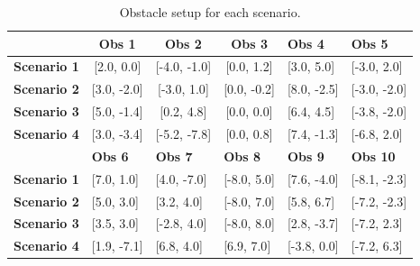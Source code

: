 \documentclass{article}
\begin{document}
\begin{table}[]
	\centering
	\begin{tabular}{|c|l|l|l|l|l|}
		\hline
		& \multicolumn{1}{c|}{\textbf{Obs 1}}  & \multicolumn{1}{c|}{\textbf{Obs 2}}   & \multicolumn{1}{c|}{\textbf{Obs 3}}  & \textbf{Obs 4}  & \textbf{Obs 5}   \\ \hline
		\textbf{Scenario 1}             & \multicolumn{1}{c|}{{[}2.0, 0.0{]}}  & \multicolumn{1}{c|}{{[}-4.0, -1.0{]}} & \multicolumn{1}{c|}{{[}0.0, 1.2{]}}  & {[}3.0, 5.0{]}  & {[}-3.0, 2.0{]}  \\ \hline
		\textbf{Scenario 2}             & \multicolumn{1}{c|}{{[}3.0, -2.0{]}} & \multicolumn{1}{c|}{{[}-3.0, 1.0{]}}  & \multicolumn{1}{c|}{{[}0.0, -0.2{]}} & {[}8.0, -2.5{]} & {[}-3.0, -2.0{]} \\ \hline
		\textbf{Scenario 3}             & \multicolumn{1}{c|}{{[}5.0, -1.4{]}} & \multicolumn{1}{c|}{{[}0.2, 4.8{]}}   & \multicolumn{1}{c|}{{[}0.0, 0.0{]}}  & {[}6.4, 4.5{]}  & {[}-3.8, -2.0{]} \\ \hline
		\textbf{Scenario 4}             & \multicolumn{1}{c|}{{[}3.0, -3.4{]}} & \multicolumn{1}{c|}{{[}-5.2, -7.8{]}} & \multicolumn{1}{c|}{{[}0.0, 0.8{]}}  & {[}7.4, -1.3{]} & {[}-6.8, 2.0{]}  \\ \hline
		\multicolumn{1}{|l|}{\textbf{}} & \textbf{Obs 6}                       & \textbf{Obs 7}                        & \textbf{Obs 8}                       & \textbf{Obs 9}  & \textbf{Obs 10}  \\ \hline
		\textbf{Scenario 1}             & {[}7.0, 1.0{]}                       & {[}4.0, -7.0{]}                       & {[}-8.0, 5.0{]}                      & {[}7.6, -4.0{]} & {[}-8.1, -2.3{]} \\ \hline
		\textbf{Scenario 2}             & {[}5.0, 3.0{]}                       & {[}3.2, 4.0{]}                        & {[}-8.0, 7.0{]}                      & {[}5.8, 6.7{]}  & {[}-7.2, -2.3{]} \\ \hline
		\textbf{Scenario 3}             & {[}3.5, 3.0{]}                       & {[}-2.8, 4.0{]}                       & {[}-8.0, 8.0{]}                      & {[}2.8, -3.7{]} & {[}-7.2, 2.3{]}  \\ \hline
		\textbf{Scenario 4}             & {[}1.9, -7.1{]}                      & {[}6.8, 4.0{]}                        & {[}6.9, 7.0{]}                       & {[}-3.8, 0.0{]} & {[}-7.2, 6.3{]}  \\ \hline
	\end{tabular}
	\caption{Obstacle setup for each scenario. }
	\label{tab:sce_obs}
\end{table}
\end{document}
